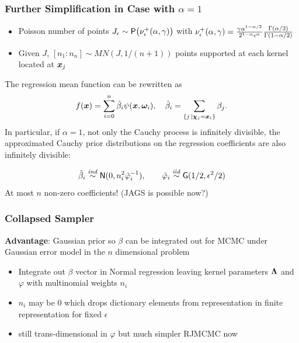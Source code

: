 \documentclass[]{beamer}
\newcommand{\bs}[2]{\begin{frame} \frametitle{#1}
{#2}
\end{frame} }
\begin{document}
\bs{Further Simplification in Case with $\alpha = 1$} {
  \begin{itemize}
  \item Poisson number of points $J_\epsilon\sim \mbox{\sf P}\big(
    \nu_\epsilon^+(\alpha, \gamma) \big)$ with $\nu_\epsilon^+(\alpha, \gamma)
  = \frac{\gamma \alpha^{1-\alpha/2}}{2^{1 - \alpha}\epsilon^\alpha}
  \frac{\Gamma(\alpha/2)}{\Gamma(1-\alpha/2)}$ \pause
  \item Given $J$, $[ n_1 : n_n] \sim  MN(J, 1/(n+1))$ points
    supported at each kernel located at $\bm x_j$  \pause
  \end{itemize}
The regression mean function can be rewritten as
\[
  f(\bm x) = \sum_{i=0}^n \tilde{\beta}_i \psi(\bm x, \bm \omega_i), \quad
  \tilde{\beta}_i = \sum_{\{j \, \mid \bm \chi_j = \bm x_i\}} \beta_j.
\]
\pause
In particular, if $\alpha = 1$, not only the Cauchy process is infinitely
divisible, the approximated Cauchy prior distributions on the regression
coefficients are also infinitely divisible:

$$
  \tilde{\beta}_i  \mathrel{\mathop{\sim}\limits^{\mathit{ind}}}
  \textsf{N}(0, n_i^2 \tilde{\varphi}_i^{-1}), \qquad
  \tilde{\varphi}_i \mathrel{\mathop{\sim}\limits^{\mathit{iid}}} \mbox{\sf G}( 1/2, \epsilon^2/2)
$$
\pause
At most $n$ non-zero coefficients!    (JAGS is possible now?)
}

\bs{Collapsed Sampler} {

{\bf Advantage}: Gaussian prior so $\beta$ can be integrated out for MCMC
under Gaussian error model in the $n$ dimensional problem \pause

\begin{itemize}
\item Integrate out $\beta$ vector in Normal regression leaving kernel
  parameters $\bm \Lambda$ and $\varphi$ with multinomial weights $n_i$  \pause
\item $n_i$ may be 0 which drops dictionary elements from
  representation in finite representation for fixed $\epsilon$ \pause

\item still trans-dimensional in $\varphi$ but much simpler RJMCMC now
\end{itemize}
}
\end{document}
